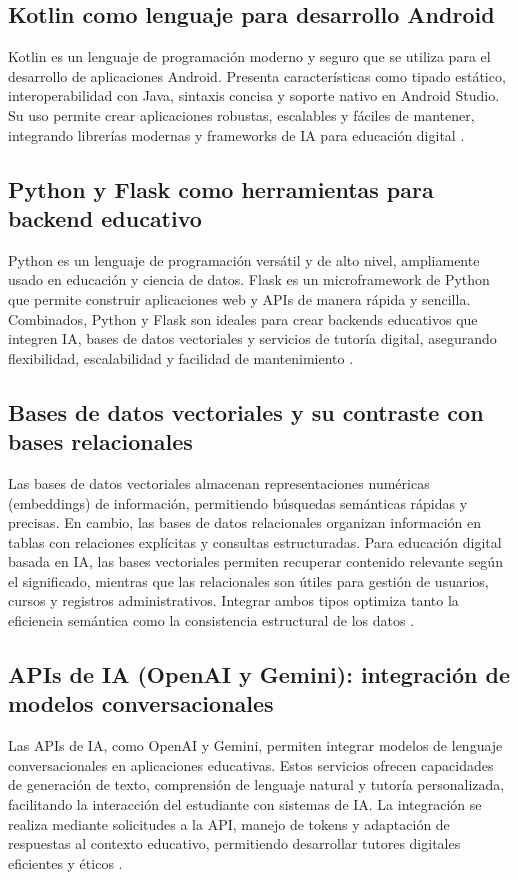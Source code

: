 \subsection{Kotlin como lenguaje para desarrollo Android}
Kotlin es un lenguaje de programación moderno y seguro que se utiliza para el
desarrollo de aplicaciones Android. Presenta características como tipado
estático, interoperabilidad con Java, sintaxis concisa y soporte nativo en
Android Studio. Su uso permite crear aplicaciones robustas, escalables y
fáciles de mantener, integrando librerías modernas y frameworks de IA para
educación digital \cite{jakewharton2017kotlin, antonio2018kotlin}.

\subsection{Python y Flask como herramientas para backend educativo}
Python es un lenguaje de programación versátil y de alto nivel, ampliamente
usado en educación y ciencia de datos. Flask es un microframework de Python que
permite construir aplicaciones web y APIs de manera rápida y sencilla.
Combinados, Python y Flask son ideales para crear backends educativos que
integren IA, bases de datos vectoriales y servicios de tutoría digital,
asegurando flexibilidad, escalabilidad y facilidad de mantenimiento
\cite{grinberg2018flask, lutz2013learning}.

\subsection{Bases de datos vectoriales y su contraste con bases relacionales}
Las bases de datos vectoriales almacenan representaciones numéricas
(embeddings) de información, permitiendo búsquedas semánticas rápidas y
precisas. En cambio, las bases de datos relacionales organizan información en
tablas con relaciones explícitas y consultas estructuradas. Para educación
digital basada en IA, las bases vectoriales permiten recuperar contenido
relevante según el significado, mientras que las relacionales son útiles para
gestión de usuarios, cursos y registros administrativos. Integrar ambos tipos
optimiza tanto la eficiencia semántica como la consistencia estructural de los
datos \cite{johnson2019billion, stonebraker2018case}.

\subsection{APIs de IA (OpenAI y Gemini): integración de modelos conversacionales}
Las APIs de IA, como OpenAI y Gemini, permiten integrar modelos de lenguaje
conversacionales en aplicaciones educativas. Estos servicios ofrecen
capacidades de generación de texto, comprensión de lenguaje natural y tutoría
personalizada, facilitando la interacción del estudiante con sistemas de IA. La
integración se realiza mediante solicitudes a la API, manejo de tokens y
adaptación de respuestas al contexto educativo, permitiendo desarrollar tutores
digitales eficientes y éticos \cite{openai2023api, google2024gemini}.